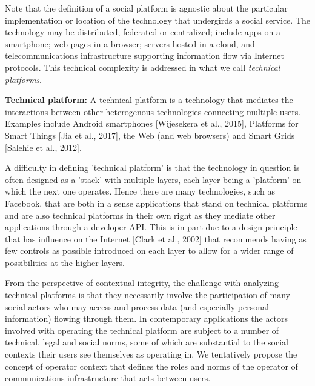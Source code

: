 \documentclass[../thesis.tex]{subfiles}
\begin{document}
\bigskip

Note that the definition of a social platform is agnostic about the
particular implementation or location of the technology that undergirds
a social service. The technology may be distributed, federated or
centralized; include apps on a smartphone; web pages in a browser;
servers hosted in a {\textquotedbl}cloud{\textquotedbl}, and
telecommunications infrastructure supporting information flow via
Internet protocols. This technical complexity is addressed in what we
call \textit{technical platforms}.


\bigskip

\textbf{Technical platform: }A technical platform is a technology that
mediates the interactions between other heterogenous technologies
connecting multiple users. Examples include Android smartphones
[Wijesekera et al., 2015], Platforms for Smart Things [Jia et al.,
2017], the Web (and web browsers) and Smart Grids [Salehie et al.,
2012].


\bigskip

A difficulty in defining 'technical
platform' is that the technology in question is often
designed as a 'stack' with multiple
layers, each layer being a 'platform'
on which the next one operates. Hence there are many technologies, such
as Facebook, that are both in a sense
{\textquotedbl}applications{\textquotedbl} that stand on technical
platforms and are also technical platforms in their own right as they
mediate other applications through a developer API. This is in part due
to a design principle that has influence on the Internet [Clark et al.,
2002] that recommends having as few controls as possible introduced on
each layer to allow for a wider range of possibilities at the higher
layers.


\bigskip

From the perspective of contextual integrity, the challenge with
analyzing technical platforms is that they necessarily involve the
participation of many social actors who may access and process data
(and especially personal information) flowing through them. In
contemporary applications the actors involved with operating the
technical platform are subject to a number of technical, legal and
social norms, some of which are substantial to the social contexts
their users see themselves as operating in. We tentatively propose the
concept of {\textquotedbl}operator context{\textquotedbl} that defines
the roles and norms of the operator of communications infrastructure
that acts between users. 
\end{document}
